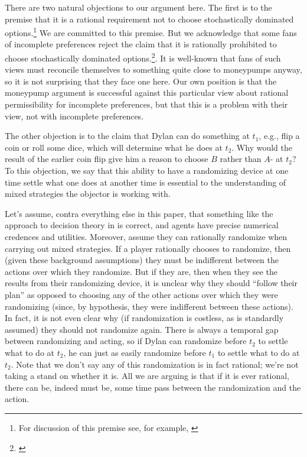 \documentclass[
  11pt,
  letterpaper]{article}
\begin{document}
There are two natural objections to our argument here. The first is to the premise that it is a rational requirement not to choose stochastically dominated options.\footnote{For discussion of this premise see, for example, \citet{hare2010take,bader2018stochastic,ledermanmarbles,tarsneyexpected}} We are committed to this premise. But we acknowledge that some fans of incomplete preferences reject the claim that it is rationally prohibited to choose stochastically dominated options.\footnote{ \citet{bales2014decision,schoenfield2014decision}}. It is well-known that fans of such views must reconcile themselves to something quite close to moneypumps anyway, so it is not surprising that they face one here. Our own position is that the moneypump argument is successful against this particular view about rational permissibility for incomplete preferences, but that this is a problem with their view, not with incomplete preferences.

The other objection is to the claim that Dylan can do something at $t_1$, e.g., flip a coin or roll some dice, which will determine what he does at $t_2$. Why would the result of the earlier coin flip give him a reason to choose $B$ rather than $A$- at $t_2$? To this objection, we say that this ability to have a randomizing device at one time settle what one does at another time is essential to the understanding of mixed strategies the objector is working with.

Let's assume, contra everything else in this paper, that something like the approach to decision theory in \citet{vNM1944} is correct, and agents have precise numerical credences and utilities. Moreover, assume they can rationally randomize when carrying out mixed strategies. If a player rationally chooses to randomize, then (given these background assumptions) they must be indifferent between the actions over which they randomize. But if they are, then when they see the results from their randomizing device, it is unclear why they should ``follow their plan'' as opposed to choosing any of the other actions over which they were randomizing (since, by hypothesis, they were indifferent between these actions). In fact, it is not even clear why (if randomization is costless, as is standardly assumed) they should not randomize again. There is always a temporal gap between randomizing and acting, so if Dylan can randomize before $t_2$ to settle what to do at $t_2$, he can just as easily randomize before $t_1$ to settle what to do at $t_2$. Note that we don't say any of this randomization is in fact rational; we're not taking a stand on whether it is. All we are arguing is that if it is ever rational, there can be, indeed must be, some time pass between the randomization and the action.
\end{document}
